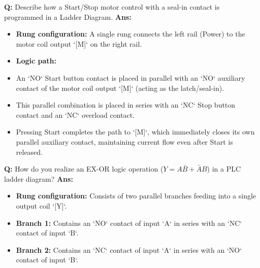 \documentclass[10pt,a4paper,twocolumn]{article}
\begin{document}
\begin{tcolorbox}[
  colback=white,
  colframe=UnitColorThree,
  colbacktitle=gray!10!white,
  coltitle=black,
  fonttitle=\bfseries\sffamily\small,
  title={Unit III $\bullet$ Card 9: PLC Ladder Logic - Motor Start/Stop},
  boxrule=1.2pt,
  arc=2mm,
  outer arc=2mm,
  boxsep=1.5mm,
  top=1mm,
  bottom=1mm,
  left=1.5mm,
  right=1.5mm,
  before skip=2.5mm,
  after skip=2.5mm
]
\textbf{Q:} Describe how a Start/Stop motor control with a seal-in contact is programmed in a Ladder Diagram.
\tcbline
\textbf{Ans:} \begin{itemize}
  \item   \textbf{Rung configuration:} A single rung connects the left rail (Power) to the motor coil output `[M]` on the right rail.
  \item   \textbf{Logic path:}
  \item   An `NO` Start button contact is placed in parallel with an `NO` auxiliary contact of the motor coil output `[M]` (acting as the latch/seal-in).
  \item   This parallel combination is placed in series with an `NC` Stop button contact and an `NC` overload contact.
  \item   Pressing Start completes the path to `[M]`, which immediately closes its own parallel auxiliary contact, maintaining current flow even after Start is released.
\end{itemize}
\end{tcolorbox}


\begin{tcolorbox}[
  colback=white,
  colframe=UnitColorThree,
  colbacktitle=gray!10!white,
  coltitle=black,
  fonttitle=\bfseries\sffamily\small,
  title={Unit III $\bullet$ Card 10: PLC Ladder Logic - EX-OR Gate},
  boxrule=1.2pt,
  arc=2mm,
  outer arc=2mm,
  boxsep=1.5mm,
  top=1mm,
  bottom=1mm,
  left=1.5mm,
  right=1.5mm,
  before skip=2.5mm,
  after skip=2.5mm
]
\textbf{Q:} How do you realize an EX-OR logic operation ($Y = A \bar{B} + \bar{A} B$) in a PLC ladder diagram?
\tcbline
\textbf{Ans:} \begin{itemize}
  \item   \textbf{Rung configuration:} Consists of two parallel branches feeding into a single output coil `[Y]`.
  \item   \textbf{Branch 1:} Contains an `NO` contact of input `A` in series with an `NC` contact of input `B`.
  \item   \textbf{Branch 2:} Contains an `NC` contact of input `A` in series with an `NO` contact of input `B`.
\end{itemize}
\end{tcolorbox}
\end{document}
